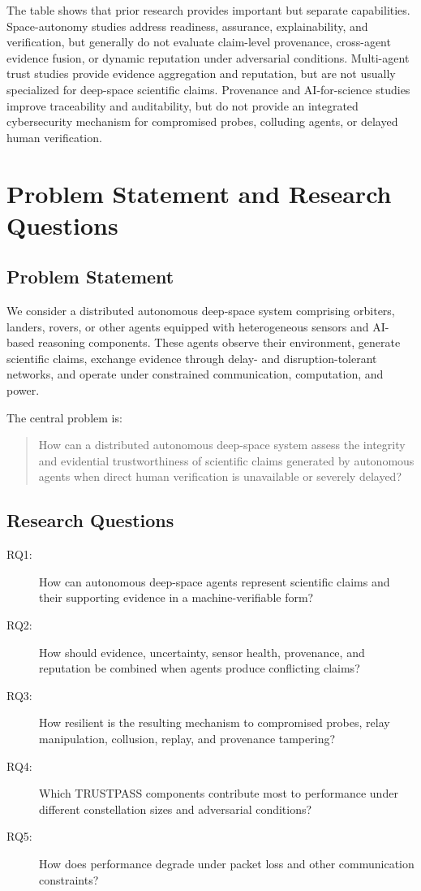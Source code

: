 \documentclass[10pt,conference]{IEEEtran}
\begin{document}
The table shows that prior research provides important but separate capabilities. Space-autonomy studies address readiness, assurance, explainability, and verification, but generally do not evaluate claim-level provenance, cross-agent evidence fusion, or dynamic reputation under adversarial conditions. Multi-agent trust studies provide evidence aggregation and reputation, but are not usually specialized for deep-space scientific claims. Provenance and AI-for-science studies improve traceability and auditability, but do not provide an integrated cybersecurity mechanism for compromised probes, colluding agents, or delayed human verification.

\section{Problem Statement and Research Questions}
\label{sec:problem}

\subsection{Problem Statement}

We consider a distributed autonomous deep-space system comprising orbiters, landers, rovers, or other agents equipped with heterogeneous sensors and AI-based reasoning components. These agents observe their environment, generate scientific claims, exchange evidence through delay- and disruption-tolerant networks, and operate under constrained communication, computation, and power.

The central problem is:

\begin{quote}
How can a distributed autonomous deep-space system assess the integrity and evidential trustworthiness of scientific claims generated by autonomous agents when direct human verification is unavailable or severely delayed?
\end{quote}

\subsection{Research Questions}

\begin{description}
  \item[RQ1:] How can autonomous deep-space agents represent scientific claims and their supporting evidence in a machine-verifiable form?
  \item[RQ2:] How should evidence, uncertainty, sensor health, provenance, and reputation be combined when agents produce conflicting claims?
  \item[RQ3:] How resilient is the resulting mechanism to compromised probes, relay manipulation, collusion, replay, and provenance tampering?
  \item[RQ4:] Which TRUSTPASS components contribute most to performance under different constellation sizes and adversarial conditions?
  \item[RQ5:] How does performance degrade under packet loss and other communication constraints?
\end{description}
\end{document}
